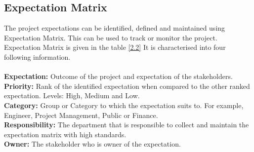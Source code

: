 \documentclass[a4paper]{article}
\begin{document}
\subsection{Expectation Matrix}
The project expectations can be identified, defined and maintained using Expectation Matrix. This can be used to track or monitor the project. Expectation Matrix is given in the table \ref{2.2} It is characterised into four following information. \\
\\
\textbf{Expectation:} Outcome of the project and expectation of the stakeholders. \\
\textbf{Priority:} Rank of the identified expectation when compared to the other ranked expectation. Levels: High, Medium and Low. \\
\textbf{Category:} Group or Category to which the expectation suits to. For example, Engineer, Project Management, Public or Finance. \\
\textbf{Responsibility:} The department that is responsible to collect and maintain the expectation matrix with high standards. \\
\textbf{Owner:} The stakeholder who is owner of the expectation. 
\end{document}
